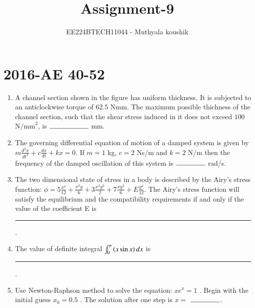 \documentclass[journal,12pt,onecolumn]{IEEEtran}
\theoremstyle{remark}
\begin{document}

\vspace{3cm}

\title{Assignment-9}
\author{EE224BTECH11044 - Muthyala koushik
}
\maketitle
\bigskip

\renewcommand{\thefigure}{\theenumi}
\renewcommand{\thetable}{\theenumi}

\section{2016-AE 40-52}
\begin{enumerate}[start=40]
	\item A channel section shown in the figure has uniform thickness. It is subjected to an anticlockwise torque of $62.5$ Nmm. The maximum possible thichness of the channel section, such that the shear stress induced in it does not exceed $100$ $\text{N/mm}^2$, is $\rule{2cm}{0.4pt}$ mm.\\
\begin{figure}[H]
    \centering
\end{figure}

	\item The governing differential equation of motion of a damped system is given by $m \frac{d^2 x}{dt^2} + c \frac{dx}{dt} + kx = 0$. If $m = 1$ kg, $c = 2$ Ns/m and $k = 2$ N/m then the frequency of the damped oscillation of this system is $\rule{1.5cm}{0.4pt}$ rad/s.\\

	\item The two dimensional state of stress in a body is described by the Airy's stress function: $\phi = 5\frac{x^4}{12} + \frac{x^3y}{6} + 3\frac{x^2y^2}{2} + 7\frac{xy^3}{6} + E\frac{y^4}{12}$. The Airy's stress function will satisfy the equilibrium and the compatibility requirements if and only if the value of the coefficient E is \rule{1.5cm}{0.4pt}.\\
		
	\item The value of definite integral $\int_{0}^{\pi}\left(x\sin{x}\right)dx$ is \rule{1.5cm}{0.4pt}.\\
		
	\item Use Newton-Raphson method to solve the equation: $xe^{x}=1$ . Begin with the initial guess $x_0=0.5$ . The solution after one step is $x =$ $\rule{1.5cm}{0.4pt}$.\\


\end{enumerate}
\end{document}
